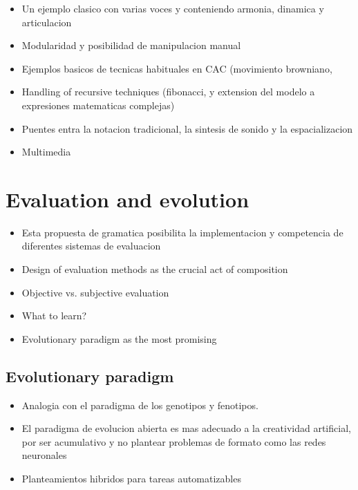 \documentclass{article}
\begin{document}
{\begin{itemize}
\item Un ejemplo clasico con varias voces y conteniendo armonia, dinamica y articulacion
\item Modularidad y posibilidad de manipulacion manual
\item Ejemplos basicos de tecnicas habituales en CAC (movimiento browniano,
\item Handling of recursive techniques (fibonacci, y extension del modelo a expresiones matematicas complejas)
\item Puentes entra la notacion tradicional, la sintesis de sonido y la espacializacion
\item Multimedia
\end{itemize}









\section{Evaluation and evolution}

\begin{itemize}
\item Esta propuesta de gramatica posibilita la implementacion y competencia de diferentes sistemas de evaluacion
\item Design of evaluation methods as the crucial act of composition
\item Objective vs. subjective evaluation
\item What to learn?
\item Evolutionary paradigm as the most promising
\end{itemize}

\subsection{Evolutionary paradigm}

\begin{itemize}
\item Analogia con el paradigma de los genotipos y fenotipos.
\item El paradigma de evolucion abierta es mas adecuado a la creatividad artificial, por ser acumulativo y no plantear problemas de formato como las redes neuronales
\item Planteamientos hibridos para tareas automatizables
\end{itemize}

}
\end{document}
